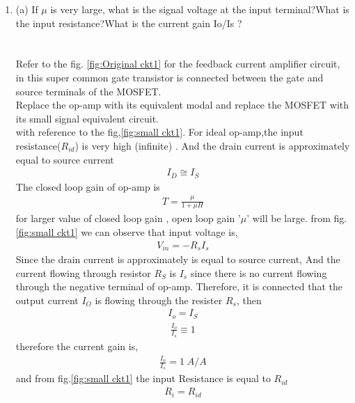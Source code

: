 \begin{enumerate}[label=\thesection.\arabic*.,ref=\thesection.\theenumi]
\item 
\label{Question_1a_ee18btech11023}
(a) If $\mu$ is very large, what is the signal voltage at the input
terminal?What is the input resistance?What is the current
gain Io/Is ?\\
\\
\solution \\
Refer to the fig. \ref{fig:Original ckt1} for the feedback current amplifier circuit, in this super common gate transistor is connected between the gate and source terminals of the MOSFET.\\
Replace the op-amp with its equivalent modal and replace the MOSFET with its small signal equivalent circuit.\\
with reference to the fig,\ref{fig:small ckt1}. For ideal op-amp,the input resistance($R_{id}$) is very high (infinite) . And the drain current is approximately equal to source current
\begin{align}
    I_{D} \cong  I_{S}
\label{eq_ee18btech11023_1}
\end{align}
The closed loop gain of op-amp is
\begin{align}
    T = \frac{\mu}{1 + \mu H}
    \label{eq_ee18btech11023_2}
\end{align}
for larger value of closed loop gain , open loop gain '$\mu$' will be large. 
from fig.\ref{fig:small ckt1} we can observe that input voltage is,
\begin{align}
    V_{in} = -R_sI_s
    \label{eq_ee18btech11023_3}
\end{align}
Since the drain current is approximately is equal to source current, And the current flowing through resistor $R_S$ is $I_s$ since there is no current flowing through the negative terminal of  op-amp. Therefore, it is connected that the output current $I_O$ is flowing through the resister $R_s$, then
\begin{align}
    I_o = I_S
    \label{eq_ee18btech11023_4}
\end{align}
\begin{align*}
    \frac{I_o}{I_s} \equiv 1 
\end{align*}
therefore the current gain is,
\begin{align}
    \frac{I_o}{I_s} = 1 \; A/A
    \label{eq_ee18btech11023_5}
\end{align}
and from fig.\ref{fig:small ckt1} the input Resistance is equal to $R_{id}$
\begin{align}
    R_{i} = R_{id}
    \label{eq_ee18btech11023_6}
\end{align}


\end{enumerate}
